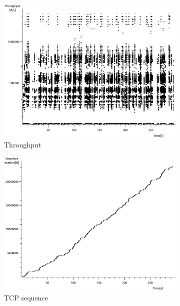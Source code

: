 \documentclass[conference,a4paper]{../../sty/IEEEtran}
\begin{document}
\begin{figure}
 \centering
 \begin{subfigure}[b]{0.2\textwidth}
  \includegraphics[width=\textwidth]{s2-0_thru}
  \caption{Throughput}
 \end{subfigure}
 \begin{subfigure}[b]{0.2\textwidth}
  \includegraphics[width=\textwidth]{s2-0_seq}
  \caption{TCP sequence}
 \end{subfigure}
 \begin{subfigure}[b]{0.2\textwidth}

\end{subfigure}
\end{figure}
\end{document}
